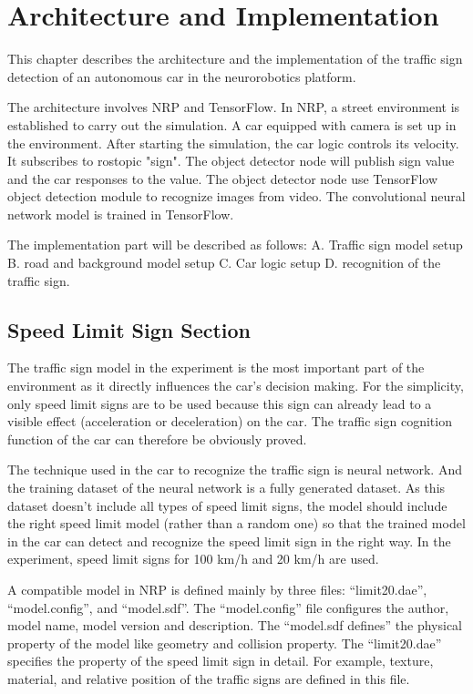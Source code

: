 
\section{Architecture and Implementation}

This chapter describes the architecture and the implementation of the traffic sign detection of an autonomous car in the neurorobotics platform. 

The architecture involves NRP and TensorFlow. In NRP, a street environment is established to carry out the simulation. A car equipped with camera is set up in the environment. After starting the simulation, the car logic controls its velocity. It subscribes to rostopic "sign". The object detector node will publish sign value and the car responses to the value. The object detector node use TensorFlow object detection module to recognize images from video. The convolutional neural network model is trained in TensorFlow.  

The implementation part will be described as follows: A. Traffic sign model setup B. road and background model setup C. Car logic setup D. recognition of the traffic sign.

\subsection{Speed Limit Sign Section}

The traffic sign model in the experiment is the most important part of the environment as it directly influences the car’s decision making. For the simplicity, only speed limit signs are to be used because this sign can already lead to a visible effect (acceleration or deceleration) on the car. The traffic sign cognition function of the car can therefore be obviously proved. 



The technique used in the car to recognize the traffic sign is neural network. And the training dataset of the neural network is a fully generated dataset. As this dataset doesn’t include all types of speed limit signs, the model should include the right speed limit model (rather than a random one) so that the trained model in the car can detect and recognize the speed limit sign in the right way. In the experiment, speed limit signs for 100 km/h and 20 km/h are used.



A compatible model in NRP is defined mainly by three files: ``limit20.dae'', ``model.config'', and ``model.sdf''. The ``model.config'' file configures the author, model name, model version and description. The ``model.sdf defines'' the physical property of the model like geometry and collision property. The ``limit20.dae'' specifies the property of the speed limit sign in detail. For example, texture, material, and relative position of the traffic signs are defined in this file.



